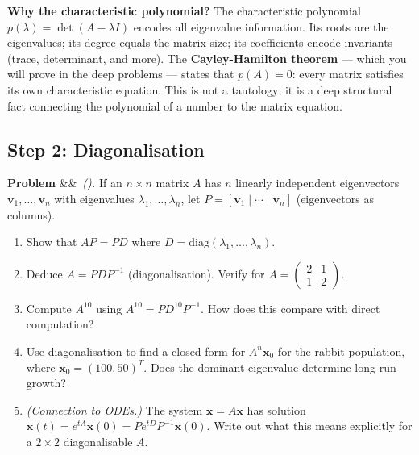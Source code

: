 \documentclass[12pt, a4paper]{article}
\newcounter{problem}
\newenvironment{problem}[1][]{\refstepcounter{problem}\par\vspace{6pt}\noindent\textbf{\color{MidBlue}Problem \theproblem}\ifx&#1&\else\ \textit{(#1)}\fi\textbf{.}\enskip}{\par\vspace{4pt}}
\begin{document}
\begin{thought}
\textbf{Why the characteristic polynomial?}
The characteristic polynomial $p(\lambda) = \det(A - \lambda I)$ encodes all eigenvalue information. Its roots are the eigenvalues; its degree equals the matrix size; its coefficients encode invariants (trace, determinant, and more). The \textbf{Cayley-Hamilton theorem} --- which you will prove in the deep problems --- states that $p(A) = 0$: every matrix satisfies its own characteristic equation. This is not a tautology; it is a deep structural fact connecting the polynomial of a number to the matrix equation.
\end{thought}

\subsection{Step 2: Diagonalisation}

\begin{problem}
\label{prob:diag}
If an $n\times n$ matrix $A$ has $n$ linearly independent eigenvectors $\mathbf{v}_1, \ldots, \mathbf{v}_n$ with eigenvalues $\lambda_1, \ldots, \lambda_n$, let $P = [\mathbf{v}_1 \mid \cdots \mid \mathbf{v}_n]$ (eigenvectors as columns).
\begin{enumerate}[label=(\alph*), topsep=2pt]
  \item Show that $AP = PD$ where $D = \text{diag}(\lambda_1, \ldots, \lambda_n)$.
  \item Deduce $A = PDP^{-1}$ (diagonalisation). Verify for $A = \begin{pmatrix}2&1\\1&2\end{pmatrix}$.
  \item Compute $A^{10}$ using $A^{10} = PD^{10}P^{-1}$. How does this compare with direct computation?
  \item Use diagonalisation to find a closed form for $A^n\mathbf{x}_0$ for the rabbit population, where $\mathbf{x}_0 = (100, 50)^T$. Does the dominant eigenvalue determine long-run growth?
  \item \textit{(Connection to ODEs.)} The system $\dot{\mathbf{x}} = A\mathbf{x}$ has solution $\mathbf{x}(t) = e^{tA}\mathbf{x}(0) = Pe^{tD}P^{-1}\mathbf{x}(0)$. Write out what this means explicitly for a $2\times 2$ diagonalisable $A$.
\end{enumerate}
\end{problem}
\end{document}
